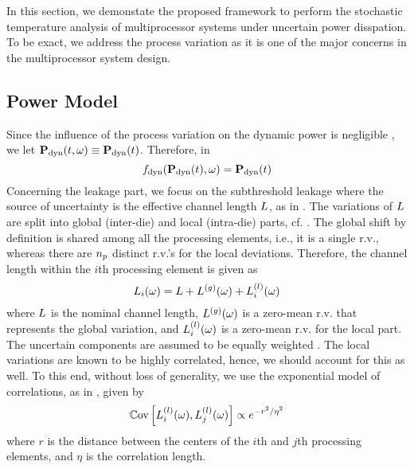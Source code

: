 In this section, we demonstate the proposed framework to perform the stochastic temperature analysis of multiprocessor systems under uncertain power disspation. To be exact, we address the process variation as it is one of the major concerns in the multiprocessor system design.

\subsection{Power Model}
Since the influence of the process variation on the dynamic power is negligible \cite{juan2012, srivastava2010}, we let $\mathbf{P}_{\text{dyn}}(t, \omega) \equiv \mathbf{P}_{\text{dyn}}(t)$. Therefore, in 
\[
  f_{\text{dyn}}(\mathbf{P}_{\text{dyn}}(t), \omega) = \mathbf{P}_{\text{dyn}}(t)
\]
Concerning the leakage part, we focus on the subthreshold leakage where the source of uncertainty is the effective channel length $L$, as in \cite{juan2012}. The variations of $L$ are split into global (inter-die) and local (intra-die) parts, cf. \cite{juan2012, srivastava2010, shen2009}. The global shift by definition is shared among all the processing elements, i.e., it is a single r.v., whereas there are ${n_p}$ distinct r.v.'s for the local deviations. Therefore, the channel length within the $i$th processing element is given as
\[
  L_i(\omega) = L + {L^{(g)}}(\omega) + L^{(l)}_i(\omega)
\]
where $L$ is the nominal channel length, ${L^{(g)}}(\omega)$ is a zero-mean r.v. that represents the global variation, and $L^{(l)}_i(\omega)$ is a zero-mean r.v. for the local part. The uncertain components are assumed to be equally weighted \cite{juan2012}. The local variations are known to be highly correlated, hence, we should account for this as well. To this end, without loss of generality, we use the exponential model of correlations, as in \cite{shen2009}, given by
\begin{equation} \elabel{covariance}
  \oCov{\lLeff_i(\o), \lLeff_j(\o)} \propto e^{-r^2/\eta^2}
\end{equation}
where $r$ is the distance between the centers of the $i$th and $j$th processing elements, and $\eta$ is the correlation length.

